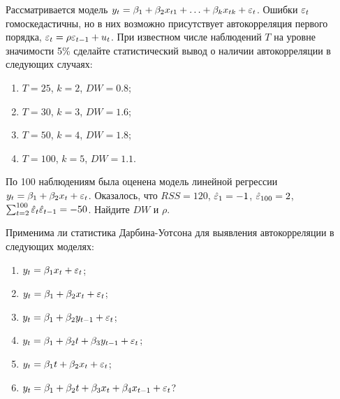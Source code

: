 \begin{problem}
Рассматривается модель $y_t=\beta_1+\beta_2 x_{t1}+\ldots+\beta_k x_{tk}+\varepsilon_t$. 
Ошибки $\varepsilon_t$ гомоскедастичны, но в них возможно присутствует автокорреляция первого порядка, $\varepsilon_t=\rho \varepsilon_{t-1}+u_t$. 
При известном числе наблюдений $T$ на уровне значимости 5\% 
сделайте статистический вывод о наличии автокорреляции в следующих случаях:
\begin{enumerate}
\item $T=25$, $k=2$, $DW=0.8$;
\item $T=30$, $k=3$, $DW=1.6$;
\item $T=50$, $k=4$, $DW=1.8$;
\item $T=100$, $k=5$, $DW=1.1$.
\end{enumerate}


\begin{sol}
\end{sol}
\end{problem}



\begin{problem}
По 100 наблюдениям была оценена модель линейной регрессии
$y_t=\beta_1+\beta_2 x_t+\varepsilon_t$. Оказалось, что $RSS=120$, $\hat{\varepsilon}_1=-1$, $\hat{\varepsilon}_{100}=2$, $\sum_{t=2}^{100} \hat{\varepsilon}_t\hat{\varepsilon}_{t-1}=-50$. 
Найдите $DW$ и $\rho$.


\begin{sol}
\end{sol}
\end{problem}



\begin{problem}
Применима ли статистика Дарбина-Уотсона для выявления автокорреляции в следующих моделях:
\begin{enumerate}
\item $y_t=\beta_1 x_t + \varepsilon_t$;
\item $y_t=\beta_1 + \beta_2 x_t + \varepsilon_t$;
\item $y_t=\beta_1 + \beta_2 y_{t-1} + \varepsilon_t$;
\item $y_t=\beta_1 + \beta_2 t +\beta_3 y_{t-1} + \varepsilon_t$;
\item $y_t=\beta_1 t + \beta_2 x_t + \varepsilon_t$;
\item $y_t=\beta_1 + \beta_2 t +\beta_3 x_t +\beta_4 x_{t-1} + \varepsilon_t$?
\end{enumerate}


\begin{sol}
\end{sol}
\end{problem}



